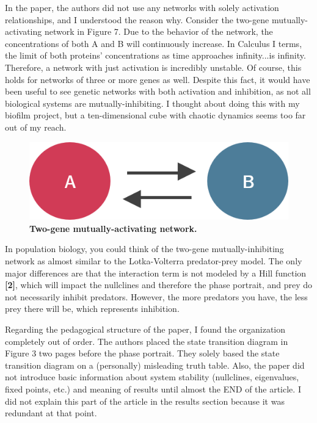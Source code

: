 \documentclass[11pt]{article}
\begin{document}
In the paper, the authors did not use any networks with solely activation relationships, and I understood the reason why. Consider the two-gene mutually-activating network in Figure 7. Due to the behavior of the network, the concentrations of both A and B will continuously increase. In Calculus I terms, the limit of both proteins’ concentrations as time approaches infinity...is infinity. Therefore, a network with just activation is incredibly unstable. Of course, this holds for networks of three or more genes as well. Despite this fact, it would have been useful to see genetic networks with both activation and inhibition, as not all biological systems are mutually-inhibiting. I thought about doing this with my biofilm project, but a ten-dimensional cube with chaotic dynamics seems too far out of my reach.

\begin{figure}[h]
\centering
\includegraphics[scale=0.4]{figure6}
\caption{\textbf{Two-gene mutually-activating network.}}
\end{figure}

In population biology, you could think of the two-gene mutually-inhibiting network as almost similar to the Lotka-Volterra predator-prey model. The only major differences are that the interaction term is not modeled by a Hill function \textbf{[2]}, which will impact the nullclines and therefore the phase portrait, and prey do not necessarily inhibit predators. However, the more predators you have, the less prey there will be, which represents inhibition. 

Regarding the pedagogical structure of the paper, I found the organization completely out of order. The authors placed the state transition diagram in Figure 3 two pages before the phase portrait. They solely based the state transition diagram on a (personally) misleading truth table. Also, the paper did not introduce basic information about system stability (nullclines, eigenvalues, fixed points, etc.) and meaning of results until almost the END of the article. I did not explain this part of the article in the results section because it was redundant at that point.
\end{document}

